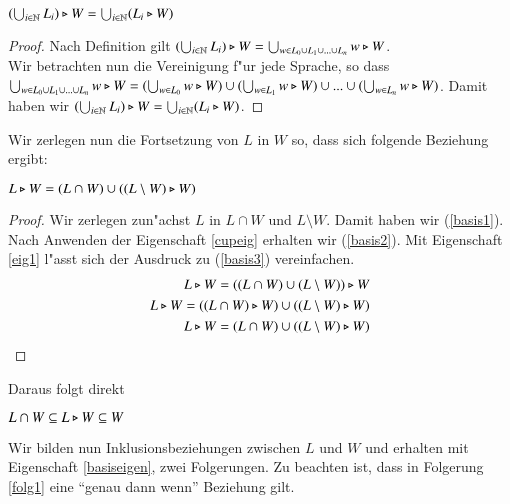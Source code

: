 \vspace{2ex}

\begin{eigen}\label{cupeig}
$(\bigcup_{i\in\mathbb{N}} L_i) \triangleright W = \bigcup_{i\in\mathbb{N}} (L_i\triangleright W)$
\end{eigen}
\begin{proof} 
Nach Definition gilt $(\bigcup_{i\in\mathbb{N}} L_i) \triangleright W = \bigcup_{w\in L_0\cup L_1\cup ... \cup L_n} w\triangleright W$.\\
Wir betrachten nun die Vereinigung f"ur jede Sprache, so dass $\bigcup_{w\in L_0\cup L_1\cup ... \cup L_n} w\triangleright W = (\bigcup_{w\in L_0} w\triangleright W) \cup (\bigcup_{w\in L_1} w\triangleright W) \cup ... \cup (\bigcup_{w\in L_n} w\triangleright W)$. Damit haben wir $ (\bigcup_{i\in\mathbb{N}} L_i) \triangleright W  = \bigcup_{i\in\mathbb{N}} (L_i\triangleright W)$.
\end{proof}

Wir zerlegen nun die Fortsetzung von $L$ in $W$ so, dass sich folgende Beziehung ergibt:

\vspace{2ex}

\begin{eigen}\label{basiseigen}
$L\triangleright W = (L\cap W) \cup ((L\setminus W) \triangleright W)$
\end{eigen}
\begin{proof}
Wir zerlegen zun"achst $L$ in $L\cap W$ und $L\setminus W$. Damit haben wir (\ref{basis1}). 
Nach Anwenden der Eigenschaft \ref{cupeig} erhalten wir (\ref{basis2}). Mit Eigenschaft \ref{eig1} l"asst sich der Ausdruck zu (\ref{basis3}) vereinfachen.
\begin{eqnarray}
L\triangleright W = ((L\cap W) \cup (L\setminus W)) \triangleright W \label{basis1}\\
L\triangleright W = ((L\cap W) \triangleright W) \cup ((L\setminus W) \triangleright W) \label{basis2} \\
L\triangleright W = (L\cap W) \cup ((L\setminus W) \triangleright W) \label{basis3} 
\end{eqnarray}
\end{proof}

Daraus folgt direkt

\vspace{2ex}

\begin{folg}\label{klaro}
$L\cap W \subseteq L\triangleright W \subseteq W$
\end{folg}


Wir bilden nun Inklusionsbeziehungen zwischen $L$ und $W$ und erhalten mit Eigenschaft \ref{basiseigen}, zwei Folgerungen.
Zu beachten ist, dass in Folgerung \ref{folg1} eine "`genau dann wenn"' Beziehung gilt.

